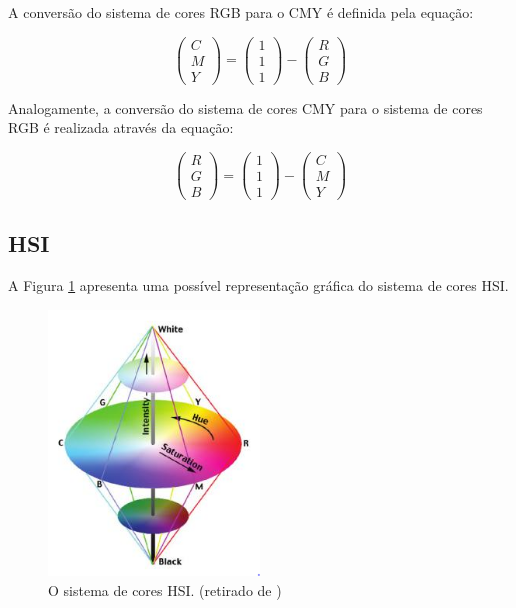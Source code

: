 \documentclass[	12pt, Times, openright, twoside, a4paper, english, brazil]{abntex2}
\begin{document}
A conversão do sistema de cores RGB para o CMY é definida pela equação:

\begin{equation}
\left(\begin{array}{r}
C\\M\\Y
\end{array}\right)
=
\left(\begin{array}{r}
1\\1\\1
\end{array}\right)
-
\left(\begin{array}{r}
R\\G\\B
\end{array}\right)
\label{eq:CMY}
\end{equation}

Analogamente, a conversão do sistema de cores CMY para o sistema de cores RGB é realizada através da equação:

\begin{equation}
\left(\begin{array}{r}
R\\G\\B
\end{array}\right)
=
\left(\begin{array}{r}
1\\1\\1
\end{array}\right)
-
\left(\begin{array}{r}
C\\M\\Y
\end{array}\right)
\end{equation}

\subsection{HSI}

A Figura \ref{fig:figuraHSI} apresenta uma possível representação gráfica do sistema de cores HSI.

\begin{figure}[!htb]
\centering \includegraphics[width=0.5\textwidth]{figuraHSI.png}
\caption{O sistema de cores HSI. (retirado de ) \label{fig:figuraHSI}}
\end{figure}
\end{document}
